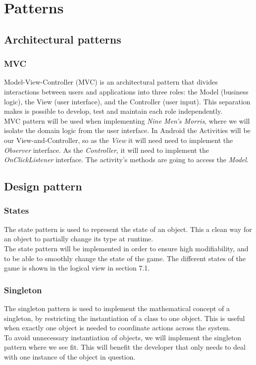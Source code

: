 \section{Patterns}

\subsection{Architectural patterns}

\subsubsection{MVC}
Model-View-Controller (MVC) is an architectural pattern that divides interactions between users and applications into three roles: the Model (business logic), the View (user interface), and the Controller (user input). This separation makes is possible to develop, test and maintain each role independently. \\

MVC pattern will be used when implementing \emph{Nine Men’s Morris}, where we will isolate the domain logic from the user interface. In Android the Activities will be our View-and-Controller, so as the \emph{View} it will need need to implement the \emph{Observer} interface. As the \emph{Controller}, it will need to implement the \emph{OnClickListener} interface. The activity's methods are going to access the \emph{Model}.

\subsection{Design pattern}
\subsubsection{States}
The state pattern is used to represent the state of an object. This a clean way for an object to partially change its type at runtime. \\

The state pattern will be implemented in order to ensure high modifiability, and to be able to smoothly change the state of the game. The different states of the game is shown in the logical view in section 7.1.

\subsubsection{Singleton}
The singleton pattern is used to implement the mathematical concept of a singleton, by restricting the instantiation of a class to one object. This is useful when exactly one object is needed to coordinate actions across the system. \\

To avoid unnecessary instantiation of objects, we will implement the singleton pattern where we see fit. This will benefit the developer that only needs to deal with one instance of the object in question.




